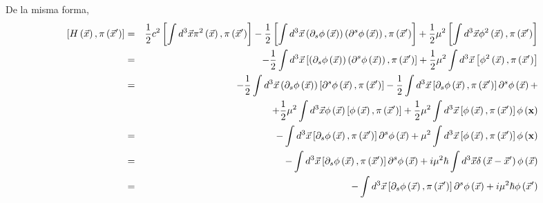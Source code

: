 \begin{enumerate}
De la misma forma,
\begin{eqnarray*}
\left[ H\left( \vec{x}\right) ,\pi \left( \vec{x}^{\prime }\right) %
\right] &=&\frac{1}{2}c^{2}\left[ \int d^{3}\vec{x}\pi ^{2}\left( 
\vec{x}\right) ,\pi \left( \vec{x}^{\prime }\right) \right] -\frac{1}{2%
}\left[ \int d^{3}\vec{x}\left( \partial _{s}\phi \left( \vec{x}%
\right) \right) \left( \partial ^{s}\phi \left( \vec{x}\right) \right)
,\pi \left( \vec{x}^{\prime }\right) \right] +\frac{1}{2}\mu ^{2}\left[
\int d^{3}\vec{x}\phi ^{2}\left( \vec{x}\right) ,\pi \left( \vec{x}%
^{\prime }\right) \right] \\
&=&-\frac{1}{2}\int d^{3}\vec{x}\left[ \left( \partial _{s}\phi \left( 
\vec{x}\right) \right) \left( \partial ^{s}\phi \left( \vec{x}\right)
\right) ,\pi \left( \vec{x}^{\prime }\right) \right] +\frac{1}{2}\mu
^{2}\int d^{3}\vec{x}\left[ \phi ^{2}\left( \vec{x}\right) ,\pi \left( 
\vec{x}^{\prime }\right) \right] \\
&=&-\frac{1}{2}\int d^{3}\vec{x}\left( \partial _{s}\phi \left( \vec{x}%
\right) \right) \left[ \partial ^{s}\phi \left( \vec{x}\right) ,\pi
\left( \vec{x}^{\prime }\right) \right] -\frac{1}{2}\int d^{3}\vec{x}%
\left[ \partial _{s}\phi \left( \vec{x}\right) ,\pi \left( \vec{x}%
^{\prime }\right) \right] \partial ^{s}\phi \left( \vec{x}\right) + \\
&&+\frac{1}{2}\mu ^{2}\int d^{3}\vec{x}\phi \left( \vec{x}\right) %
\left[ \phi \left( \vec{x}\right) ,\pi \left( \vec{x}^{\prime }\right) %
\right] +\frac{1}{2}\mu ^{2}\int d^{3}\vec{x}\left[ \phi \left( \vec{x}%
\right) ,\pi \left( \vec{x}^{\prime }\right) \right] \phi \left( {\bf x%
}\right) \\
&=&-\int d^{3}\vec{x}\left[ \partial _{s}\phi \left( \vec{x}\right)
,\pi \left( \vec{x}^{\prime }\right) \right] \partial ^{s}\phi \left( 
\vec{x}\right) +\mu ^{2}\int d^{3}\vec{x}\left[ \phi \left( \vec{x}%
\right) ,\pi \left( \vec{x}^{\prime }\right) \right] \phi \left( {\bf x%
}\right) \\
&=&-\int d^{3}\vec{x}\left[ \partial _{s}\phi \left( \vec{x}\right)
,\pi \left( \vec{x}^{\prime }\right) \right] \partial ^{s}\phi \left( 
\vec{x}\right) +i\mu ^{2}\hbar \int d^{3}\vec{x}\delta \left( 
\vec{x}-\vec{x}^{\prime }\right) \phi \left( \vec{x}\right) \\
&=&-\int d^{3}\vec{x}\left[ \partial _{s}\phi \left( \vec{x}\right)
,\pi \left( \vec{x}^{\prime }\right) \right] \partial ^{s}\phi \left( 
\vec{x}\right) +i\mu ^{2}\hbar \phi \left( \vec{x}^{\prime }\right) 
\end{eqnarray*}

\end{enumerate}
